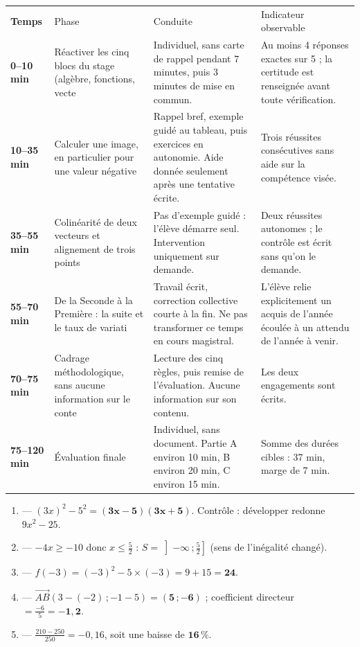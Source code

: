 \documentclass[10pt,a4paper]{article}
\begin{document}
\newpage{}
\par\noindent\begin{tabularx}{\linewidth}{>{\bfseries}p{18mm} p{34mm} X X}
\rowcolor{Navy}\color{white}Temps & \color{white}Phase & \color{white}Conduite & \color{white}Indicateur observable \\
0--10 min & Réactiver les cinq blocs du stage (algèbre, fonctions, vecte & Individuel, sans carte de rappel pendant 7 minutes, puis 3 minutes de mise en commun. & Au moins 4 réponses exactes sur 5 ; la certitude est renseignée avant toute vérification. \\
10--35 min & Calculer une image, en particulier pour une valeur négative & Rappel bref, exemple guidé au tableau, puis exercices en autonomie. Aide donnée seulement après une tentative écrite. & Trois réussites consécutives sans aide sur la compétence visée. \\
35--55 min & Colinéarité de deux vecteurs et alignement de trois points & Pas d'exemple guidé : l'élève démarre seul. Intervention uniquement sur demande. & Deux réussites autonomes ; le contrôle est écrit sans qu'on le demande. \\
55--70 min & De la Seconde à la Première : la suite et le taux de variati & Travail écrit, correction collective courte à la fin. Ne pas transformer ce temps en cours magistral. & L'élève relie explicitement un acquis de l'année écoulée à un attendu de l'année à venir. \\
70--75 min & Cadrage méthodologique, sans aucune information sur le conte & Lecture des cinq règles, puis remise de l'évaluation. Aucune information sur son contenu. & Les deux engagements sont écrits. \\
75--120 min & Évaluation finale & Individuel, sans document. Partie A environ 10 min, B environ 20 min, C environ 15 min. & Somme des durées cibles : 37 min, marge de 7 min. \\
\end{tabularx}
\newpage{}
\begin{enumerate}
\item {} --- $(3x)^2-5^2=\mathbf{(3x-5)(3x+5)}$. Contrôle : développer redonne $9x^2-25$.
\item {} --- $-4x\ge -10$ donc $x\le \frac52$ : $S=\left]-\infty\,;\tfrac52\right]$ (sens de l'inégalité changé).
\item {} --- $f(-3)=(-3)^2-5\times(-3)=9+15=\mathbf{24}$.
\item {} --- $\vec{AB}(3-(-2)\,;-1-5)=\mathbf{(5\,;-6)}$ ; coefficient directeur $=\frac{-6}{5}=\mathbf{-1{,}2}$.
\item {} --- $\frac{210-250}{250}=-0{,}16$, soit une baisse de $\mathbf{16\,\%}$.
\end{enumerate}
\end{document}
